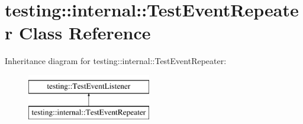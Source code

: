 \hypertarget{classtesting_1_1internal_1_1TestEventRepeater}{}\section{testing\+::internal\+::Test\+Event\+Repeater Class Reference}
\label{classtesting_1_1internal_1_1TestEventRepeater}
Inheritance diagram for testing\+::internal\+::Test\+Event\+Repeater\+:\begin{figure}[H]
\begin{center}
\leavevmode
\includegraphics[height=2.000000cm]{classtesting_1_1internal_1_1TestEventRepeater}
\end{center}
\end{figure}
